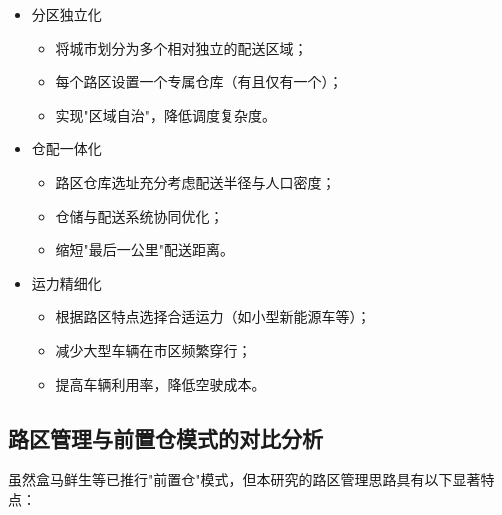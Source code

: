 \documentclass[12pt,a4paper,twoside]{ctexbook}
\begin{document}
\begin{itemize}
    \item 分区独立化
    \begin{itemize}
        \item 将城市划分为多个相对独立的配送区域；
        \item 每个路区设置一个专属仓库（有且仅有一个）；
        \item 实现"区域自治"，降低调度复杂度。
    \end{itemize}
    
    \item 仓配一体化
    \begin{itemize}
        \item 路区仓库选址充分考虑配送半径与人口密度；
        \item 仓储与配送系统协同优化；
        \item 缩短"最后一公里"配送距离。
    \end{itemize}
    
    \item 运力精细化
    \begin{itemize}
        \item 根据路区特点选择合适运力（如小型新能源车等）；
        \item 减少大型车辆在市区频繁穿行；
        \item 提高车辆利用率，降低空驶成本。
    \end{itemize}
\end{itemize}

\subsection{路区管理与前置仓模式的对比分析}
虽然盒马鲜生等已推行"前置仓"模式，但本研究的路区管理思路具有以下显著特点：
\end{document}
